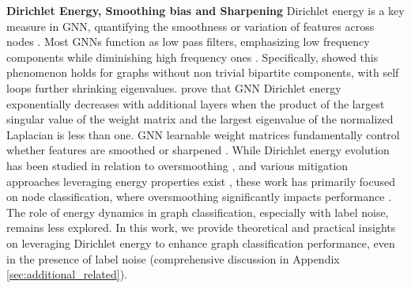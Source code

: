 \textbf{Dirichlet Energy, Smoothing bias and Sharpening} 
Dirichlet energy is a key measure in GNN, quantifying the smoothness or variation of features across nodes \citep{dirichlet}. 
Most GNNs function as low pass filters, emphasizing low frequency components while diminishing high frequency ones \citep{nt2019revisiting, rusch2023survey}. Specifically, \citet{nt2019revisiting} showed this phenomenon holds for graphs without non trivial bipartite components, with self loops further shrinking eigenvalues. \citet{noteonoversmoothing, oversmoothing2} prove that GNN Dirichlet energy exponentially decreases with additional layers when the product of the largest singular value of the weight matrix and the largest eigenvalue of the normalized Laplacian is less than one. GNN learnable weight matrices fundamentally control whether features are smoothed or sharpened \citep{GRAFF}. 
While Dirichlet energy evolution has been studied in relation to oversmoothing \citet{noteonoversmoothing, nt2019revisiting}, and various mitigation approaches leveraging energy properties exist \citet{FAGCN, dirichlet_constraint, EEConv}, these work has primarily focused on node classification, where oversmoothing significantly impacts performance \citep{2sides}. The role of energy dynamics in graph classification, especially with label noise, remains less explored.
In this work, we provide theoretical and practical insights on leveraging Dirichlet energy to enhance graph classification performance, even in the presence of label noise (comprehensive discussion in Appendix \ref{sec:additional_related}).


